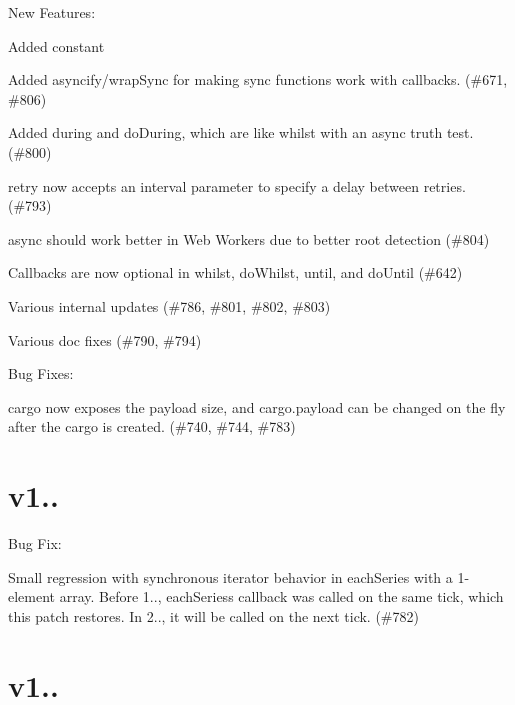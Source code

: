 New Features\+:
\begin{DoxyItemize}
\item Added {\ttfamily constant}
\item Added {\ttfamily asyncify}/{\ttfamily wrap\+Sync} for making sync functions work with callbacks. (\#671, \#806)
\item Added {\ttfamily during} and {\ttfamily do\+During}, which are like {\ttfamily whilst} with an async truth test. (\#800)
\item {\ttfamily retry} now accepts an {\ttfamily interval} parameter to specify a delay between retries. (\#793)
\item {\ttfamily async} should work better in Web Workers due to better {\ttfamily root} detection (\#804)
\item Callbacks are now optional in {\ttfamily whilst}, {\ttfamily do\+Whilst}, {\ttfamily until}, and {\ttfamily do\+Until} (\#642)
\item Various internal updates (\#786, \#801, \#802, \#803)
\item Various doc fixes (\#790, \#794)
\end{DoxyItemize}

Bug Fixes\+:
\begin{DoxyItemize}
\item {\ttfamily cargo} now exposes the {\ttfamily payload} size, and {\ttfamily cargo.\+payload} can be changed on the fly after the {\ttfamily cargo} is created. (\#740, \#744, \#783)
\end{DoxyItemize}

\section*{v1..}

Bug Fix\+:


\begin{DoxyItemize}
\item Small regression with synchronous iterator behavior in {\ttfamily each\+Series} with a 1-\/element array. Before 1.., {\ttfamily each\+Series}\textquotesingle{}s callback was called on the same tick, which this patch restores. In 2.., it will be called on the next tick. (\#782)
\end{DoxyItemize}

\section*{v1..}

